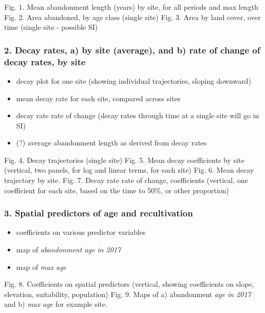 \documentclass[
]{article}
\providecommand{\tightlist}{%
  \setlength{\itemsep}{0pt}\setlength{\parskip}{0pt}}
\begin{document}
Fig. 1. Mean abandonment length (years) by site, for all periods and max length
Fig. 2. Area abandoned, by age class (single site)
Fig. 3. Area by land cover, over time (single site - possible SI)

\hypertarget{decay-rates-a-by-site-average-and-b-rate-of-change-of-decay-rates-by-site}{%
\subsubsection{2. Decay rates, a) by site (average), and b) rate of change of decay rates, by site}\label{decay-rates-a-by-site-average-and-b-rate-of-change-of-decay-rates-by-site}}

\begin{itemize}
\tightlist
\item
  decay plot for one site (showing individual trajectories, sloping downward)
\item
  mean decay rate for each site, compared across sites
\item
  decay rate rate of change (decay rates through time at a single site will go in SI)
\item
  (?) average abandonment length as derived from decay rates
\end{itemize}

Fig. 4. Decay trajectories (single site)
Fig. 5. Mean decay coefficients by site (vertical, two panels, for log and linear terms, for each site)
Fig. 6. Mean decay trajectory by site.
Fig. 7. Decay rate rate of change, coefficients (vertical, one coefficient for each site, based on the time to 50\%, or other proportion)

\hypertarget{spatial-predictors-of-age-and-recultivation}{%
\subsubsection{3. Spatial predictors of age and recultivation}\label{spatial-predictors-of-age-and-recultivation}}

\begin{itemize}
\tightlist
\item
  coefficients on various predictor variables
\item
  map of \emph{abandonment age in 2017}
\item
  map of \emph{max age}
\end{itemize}

Fig. 8. Coefficients on spatial predictors (vertical, showing coefficients on slope, elevation, suitability, population)
Fig. 9. Maps of a) abandonment \emph{age in 2017} and b) \emph{max age} for example site.
\end{document}

